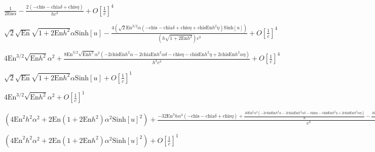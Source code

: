 \documentclass{article}
\begin{document}
\begin{doublespace}
\noindent\(\frac{1}{2 \text{En} \alpha }-\frac{2 (-\text{chis}-\text{chia} \delta +\text{chis} \eta )}{h c^3}+O\left[\frac{1}{c}\right]^4\)
\end{doublespace}

\begin{doublespace}
\noindent\(\sqrt{2} \sqrt{\text{En}} \sqrt{1+2 \text{En} h^2} \alpha  \text{Sinh}[u]-\frac{4 \left(\sqrt{2} \text{En}^{3/2} \alpha  \left(-\text{chis}-\text{chia}
\delta +\text{chis} \eta +\text{chis} \text{En} h^2 \eta \right) \text{Sinh}[u]\right)}{\left(h \sqrt{1+2 \text{En} h^2}\right) c^3}+O\left[\frac{1}{c}\right]^4\)
\end{doublespace}

\begin{doublespace}
\noindent\(4 \text{En}^{3/2} \sqrt{\text{En} h^2} \alpha ^2+\frac{8 \text{En}^{3/2} \sqrt{\text{En} h^2} \alpha ^2 \left(-2 \text{chis} \text{En}
h^2 \alpha -2 \text{chia} \text{En} h^2 \alpha  \delta -\text{chis} \eta -\text{chis} \text{En} h^2 \eta +2 \text{chis} \text{En} h^2 \alpha  \eta
\right)}{h^3 c^3}+O\left[\frac{1}{c}\right]^4\)
\end{doublespace}

\begin{doublespace}
\noindent\(\sqrt{2} \sqrt{\text{En}} \sqrt{1+2 \text{En} h^2} \alpha  \text{Sinh}[u]+O\left[\frac{1}{c}\right]^1\)
\end{doublespace}

\begin{doublespace}
\noindent\(4 \text{En}^{3/2} \sqrt{\text{En} h^2} \alpha ^2+O\left[\frac{1}{c}\right]^1\)
\end{doublespace}

\begin{doublespace}
\noindent\(\left(4 \text{En}^2 h^2 \alpha ^2+2 \text{En} \left(1+2 \text{En} h^2\right) \alpha ^2 \text{Sinh}[u]^2\right)+\frac{-32 \text{En}^3 h
\alpha ^3 (-\text{chis}-\text{chia} \delta +\text{chis} \eta )+\frac{16 \text{En}^2 \alpha ^2 \left(-2 \text{chis} \text{En} h^2 \alpha -2 \text{chia}
\text{En} h^2 \alpha  \delta -\text{chis} \eta -\text{chis} \text{En} h^2 \eta +2 \text{chis} \text{En} h^2 \alpha  \eta \right)}{h}-\frac{16 \text{En}^2
\alpha ^2 \left(-\text{chis}-\text{chia} \delta +\text{chis} \eta +\text{chis} \text{En} h^2 \eta \right) \text{Sinh}[u]^2}{h}}{c^3}+O\left[\frac{1}{c}\right]^4\)
\end{doublespace}

\begin{doublespace}
\noindent\(\left(4 \text{En}^2 h^2 \alpha ^2+2 \text{En} \left(1+2 \text{En} h^2\right) \alpha ^2 \text{Sinh}[u]^2\right)+O\left[\frac{1}{c}\right]^1\)
\end{doublespace}
\end{document}
